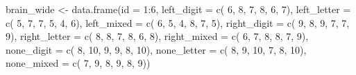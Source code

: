 \documentclass[
]{article}
\newenvironment{Shaded}{\begin{snugshade}}{\end{snugshade}}
\newcommand{\AttributeTok}[1]{\textcolor[rgb]{0.77,0.63,0.00}{#1}}
\newcommand{\DecValTok}[1]{\textcolor[rgb]{0.00,0.00,0.81}{#1}}
\newcommand{\FunctionTok}[1]{\textcolor[rgb]{0.00,0.00,0.00}{#1}}
\newcommand{\NormalTok}[1]{#1}
\newcommand{\OtherTok}[1]{\textcolor[rgb]{0.56,0.35,0.01}{#1}}
\newcommand{\SpecialCharTok}[1]{\textcolor[rgb]{0.00,0.00,0.00}{#1}}
\begin{document}
\begin{Shaded}
\begin{Highlighting}[]
\NormalTok{brain\_wide }\OtherTok{\textless{}{-}} \FunctionTok{data.frame}\NormalTok{(}\AttributeTok{id =} \DecValTok{1}\SpecialCharTok{:}\DecValTok{6}\NormalTok{,}
                         \AttributeTok{left\_digit   =} \FunctionTok{c}\NormalTok{( }\DecValTok{6}\NormalTok{,  }\DecValTok{8}\NormalTok{,  }\DecValTok{7}\NormalTok{,  }\DecValTok{8}\NormalTok{,  }\DecValTok{6}\NormalTok{,  }\DecValTok{7}\NormalTok{),}
                         \AttributeTok{left\_letter  =} \FunctionTok{c}\NormalTok{( }\DecValTok{5}\NormalTok{,  }\DecValTok{7}\NormalTok{,  }\DecValTok{7}\NormalTok{,  }\DecValTok{5}\NormalTok{,  }\DecValTok{4}\NormalTok{,  }\DecValTok{6}\NormalTok{),}
                         \AttributeTok{left\_mixed   =} \FunctionTok{c}\NormalTok{( }\DecValTok{6}\NormalTok{,  }\DecValTok{5}\NormalTok{,  }\DecValTok{4}\NormalTok{,  }\DecValTok{8}\NormalTok{,  }\DecValTok{7}\NormalTok{,  }\DecValTok{5}\NormalTok{),}
                         \AttributeTok{right\_digit  =} \FunctionTok{c}\NormalTok{( }\DecValTok{9}\NormalTok{,  }\DecValTok{8}\NormalTok{,  }\DecValTok{9}\NormalTok{,  }\DecValTok{7}\NormalTok{,  }\DecValTok{7}\NormalTok{,  }\DecValTok{9}\NormalTok{),}
                         \AttributeTok{right\_letter =} \FunctionTok{c}\NormalTok{( }\DecValTok{8}\NormalTok{,  }\DecValTok{8}\NormalTok{,  }\DecValTok{7}\NormalTok{,  }\DecValTok{8}\NormalTok{,  }\DecValTok{6}\NormalTok{,  }\DecValTok{8}\NormalTok{),}
                         \AttributeTok{right\_mixed  =} \FunctionTok{c}\NormalTok{( }\DecValTok{6}\NormalTok{,  }\DecValTok{7}\NormalTok{,  }\DecValTok{8}\NormalTok{,  }\DecValTok{8}\NormalTok{,  }\DecValTok{7}\NormalTok{,  }\DecValTok{9}\NormalTok{),}
                         \AttributeTok{none\_digit   =} \FunctionTok{c}\NormalTok{( }\DecValTok{8}\NormalTok{, }\DecValTok{10}\NormalTok{,  }\DecValTok{9}\NormalTok{,  }\DecValTok{9}\NormalTok{,  }\DecValTok{8}\NormalTok{, }\DecValTok{10}\NormalTok{),}
                         \AttributeTok{none\_letter  =} \FunctionTok{c}\NormalTok{( }\DecValTok{8}\NormalTok{,  }\DecValTok{9}\NormalTok{, }\DecValTok{10}\NormalTok{,  }\DecValTok{7}\NormalTok{,  }\DecValTok{8}\NormalTok{, }\DecValTok{10}\NormalTok{),}
                         \AttributeTok{none\_mixed   =} \FunctionTok{c}\NormalTok{( }\DecValTok{7}\NormalTok{,  }\DecValTok{9}\NormalTok{,  }\DecValTok{8}\NormalTok{,  }\DecValTok{9}\NormalTok{,  }\DecValTok{8}\NormalTok{,  }\DecValTok{9}\NormalTok{))}
\end{Highlighting}
\end{Shaded}

\clearpage
\end{document}
